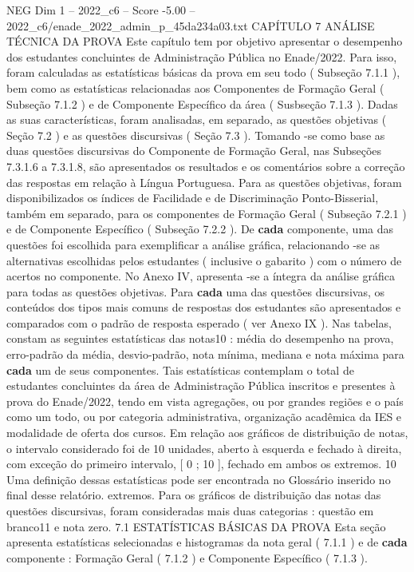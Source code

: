 \begin{textsample}{NEG Dim 1 – 2022\_c6 – Score -5.00 – 2022\_c6/enade\_2022\_admin\_p\_45da234a03.txt}  \label{ex:f1_neg_185}
CAPÍTULO 7 ANÁLISE TÉCNICA DA PROVA Este capítulo tem por objetivo apresentar o desempenho dos estudantes concluintes de Administração Pública no Enade/2022.
Para isso, foram calculadas as estatísticas básicas da prova em seu todo ( Subseção 7.1.1 ), bem como as estatísticas relacionadas aos Componentes de Formação Geral ( Subseção 7.1.2 ) e de Componente Específico da área ( Susbseção 7.1.3 ).
Dadas as suas características, foram analisadas, em separado, as questões objetivas ( Seção 7.2 ) e as questões discursivas ( Seção 7.3 ).
Tomando -se como base as duas questões discursivas do Componente de Formação Geral, nas Subseções 7.3.1.6 a 7.3.1.8, são apresentados os resultados e os comentários sobre a correção das respostas em relação à Língua Portuguesa.
Para as questões objetivas, foram disponibilizados os índices de Facilidade e de Discriminação Ponto-Bisserial, também em separado, para os componentes de Formação Geral ( Subseção 7.2.1 ) e de Componente Específico ( Subseção 7.2.2 ).
De \textbf{cada} componente, uma das questões foi escolhida para exemplificar a análise gráfica, relacionando -se as alternativas escolhidas pelos estudantes ( inclusive o gabarito ) com o número de acertos no componente.
No Anexo IV, apresenta -se a íntegra da análise gráfica para todas as questões objetivas.
Para \textbf{cada} uma das questões discursivas, os conteúdos dos tipos mais comuns de respostas dos estudantes são apresentados e comparados com o padrão de resposta esperado ( ver Anexo IX ).
Nas tabelas, constam as seguintes estatísticas das notas10 : média do desempenho na prova, erro-padrão da média, desvio-padrão, nota mínima, mediana e nota máxima para \textbf{cada} um de seus componentes.
Tais estatísticas contemplam o total de estudantes concluintes da área de Administração Pública inscritos e presentes à prova do Enade/2022, tendo em vista agregações, ou por grandes regiões e o país como um todo, ou por categoria administrativa, organização acadêmica da IES e modalidade de oferta dos cursos.
Em relação aos gráficos de distribuição de notas, o intervalo considerado foi de 10 unidades, aberto à esquerda e fechado à direita, com exceção do primeiro intervalo, [ 0 ; 10 ], fechado em ambos os extremos. 10 Uma definição dessas estatísticas pode ser encontrada no Glossário inserido no final desse relatório. extremos.
Para os gráficos de distribuição das notas das questões discursivas, foram consideradas mais duas categorias : questão em branco11 e nota zero. 7.1 ESTATÍSTICAS BÁSICAS DA PROVA Esta seção apresenta estatísticas selecionadas e histogramas da nota geral ( 7.1.1 ) e de \textbf{cada} componente : Formação Geral ( 7.1.2 ) e Componente Específico ( 7.1.3 ).

\end{textsample}
